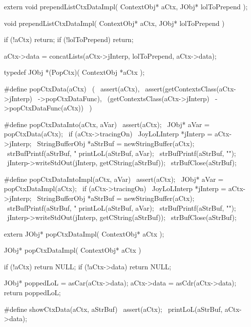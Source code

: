 \startCHeader
extern void prependListCtxDataImpl(
  ContextObj* aCtx,
  JObj* lolToPrepend
);
\stopCHeader
{}

\startCCode
void prependListCtxDataImpl(
  ContextObj* aCtx,
  JObj* lolToPrepend
) {
  if (!aCtx) return;
  if (!lolToPrepend) return;

  aCtx->data =
    concatLists(aCtx->jInterp, lolToPrepend, aCtx->data);
}
\stopCCode

\startCHeader
typedef JObj *(PopCtx)(
  ContextObj *aCtx
);

#define popCtxData(aCtx)                    \
  (                                         \
    assert(aCtx),                           \
    assert(getContextsClass(aCtx->jInterp)  \
      ->popCtxDataFunc),                    \
    (getContextsClass(aCtx->jInterp)        \
      ->popCtxDataFunc(aCtx))               \
  )

#define popCtxDataInto(aCtx, aVar)                    \
assert(aCtx);                                         \
JObj* aVar = popCtxData(aCtx);                        \
if (aCtx->tracingOn) {                                \
  JoyLoLInterp *jInterp = aCtx->jInterp;              \
  StringBufferObj *aStrBuf = newStringBuffer(aCtx);   \
  strBufPrintf(aStrBuf, "%
  printLoL(aStrBuf, aVar);                            \
  strBufPrintf(aStrBuf, "\n");                        \
  jInterp->writeStdOut(jInterp, getCString(aStrBuf)); \
  strBufClose(aStrBuf);                               \
}

#define popCtxDataIntoImpl(aCtx, aVar)                \
assert(aCtx);                                         \
JObj* aVar = popCtxDataImpl(aCtx);                    \
if (aCtx->tracingOn) {                                \
  JoyLoLInterp *jInterp = aCtx->jInterp;              \
  StringBufferObj *aStrBuf = newStringBuffer(aCtx);   \
  strBufPrintf(aStrBuf, "%
  printLoL(aStrBuf, aVar);                            \
  strBufPrintf(aStrBuf, "\n");                        \
  jInterp->writeStdOut(jInterp, getCString(aStrBuf)); \
  strBufClose(aStrBuf);                               \
}
\stopCHeader

\setCHeaderStream{private}
\startCHeader
extern JObj* popCtxDataImpl(
  ContextObj* aCtx
);
\stopCHeader
\setCHeaderStream{public}

\startCCode
JObj* popCtxDataImpl(
  ContextObj* aCtx
) {
  if (!aCtx) return NULL;
  if (!aCtx->data) return NULL;

  JObj* poppedLoL = asCar(aCtx->data);
  aCtx->data          = asCdr(aCtx->data);
  return poppedLoL;
}
\stopCCode

\startCHeader
#define showCtxData(aCtx, aStrBuf)  \
  assert(aCtx);                     \
  printLoL(aStrBuf, aCtx->data);    \
\stopCHeader

